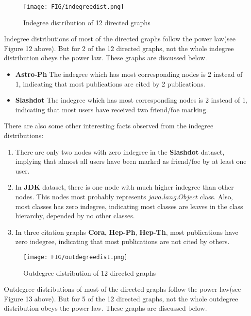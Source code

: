 \begin{figure}[H]
\begin{center}
\texttt{[image: FIG/indegreedist.png]}
\caption{Indegree distribution of 12 directed graphs}
\end{center}
\end{figure}

\par Indegree distributions of most of the directed graphs follow the power law(see Figure 12 above). But for 2 of the 12 directed graphs, not the whole indegree distribution obeys the power law. These graphs are discussed below.

\begin{itemize}
\item \textbf{Astro-Ph} The indegree which has most corresponding nodes is 2 instead of 1, indicating that most publications are cited by 2 publications.
\item \textbf{Slashdot} The indegree which has most corresponding nodes is 2 instead of 1, indicating that most users have received two friend/foe marking.
\end{itemize}

There are also some other interesting facts observed from the indegree distributions:
\begin{enumerate}
\item There are only two nodes with zero indegree in the \textbf{Slashdot} dataset, implying that almost all users have been marked as friend/foe by at least one user.
\item In \textbf{JDK} dataset, there is one node with much higher indegree than other nodes. This nodes most probably represents $java.lang.Object$ class. Also, most classes has zero indegree, indicating most classes are leaves in the class hierarchy, depended by no other classes.
\item In three citation graphs \textbf{Cora}, \textbf{Hep-Ph}, \textbf{Hep-Th}, most publications have zero indegree, indicating that most publications are not cited by others.
\end{enumerate}

\begin{figure}[H]
\begin{center}
\texttt{[image: FIG/outdegreedist.png]}
\caption{Outdegree distribution of 12 directed graphs}
\end{center}
\end{figure}

\par Outdegree distributions of most of the directed graphs follow the power law(see Figure 13 above). But for 5 of the 12 directed graphs, not the whole outdegree distribution obeys the power law. These graphs are discussed below.


